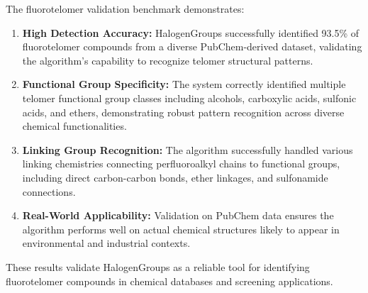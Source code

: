 The fluorotelomer validation benchmark demonstrates:

\begin{enumerate}
\item \textbf{High Detection Accuracy:} HalogenGroups successfully identified 93.5\% of fluorotelomer compounds from a diverse PubChem-derived dataset, validating the algorithm's capability to recognize telomer structural patterns.

\item \textbf{Functional Group Specificity:} The system correctly identified multiple telomer functional group classes including alcohols, carboxylic acids, sulfonic acids, and ethers, demonstrating robust pattern recognition across diverse chemical functionalities.

\item \textbf{Linking Group Recognition:} The algorithm successfully handled various linking chemistries connecting perfluoroalkyl chains to functional groups, including direct carbon-carbon bonds, ether linkages, and sulfonamide connections.

\item \textbf{Real-World Applicability:} Validation on PubChem data ensures the algorithm performs well on actual chemical structures likely to appear in environmental and industrial contexts.
\end{enumerate}

These results validate HalogenGroups as a reliable tool for identifying fluorotelomer compounds in chemical databases and screening applications.

